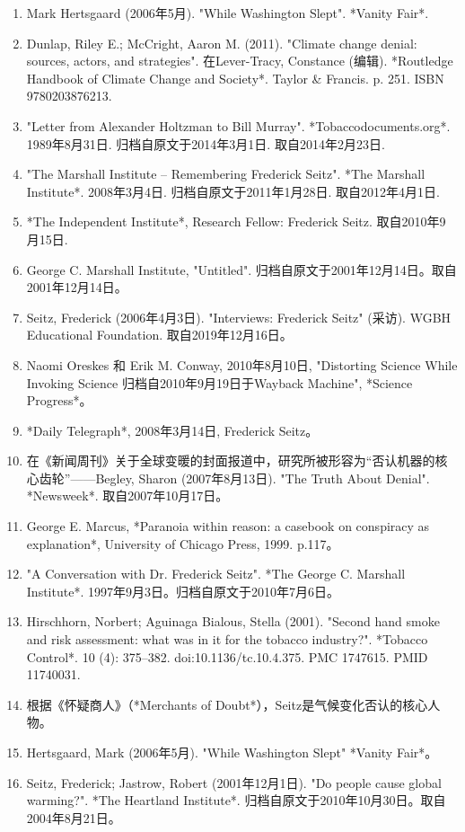 \begin{enumerate}
\item Mark Hertsgaard (2006年5月). "While Washington Slept". *Vanity Fair*.
\item Dunlap, Riley E.; McCright, Aaron M. (2011). "Climate change denial: sources, actors, and strategies". 在Lever-Tracy, Constance (编辑). *Routledge Handbook of Climate Change and Society*. Taylor & Francis. p. 251. ISBN 9780203876213.
\item "Letter from Alexander Holtzman to Bill Murray". *Tobaccodocuments.org*. 1989年8月31日. 归档自原文于2014年3月1日. 取自2014年2月23日.
\item "The Marshall Institute – Remembering Frederick Seitz". *The Marshall Institute*. 2008年3月4日. 归档自原文于2011年1月28日. 取自2012年4月1日.
\item *The Independent Institute*, Research Fellow: Frederick Seitz. 取自2010年9月15日.
\item George C. Marshall Institute, "Untitled". 归档自原文于2001年12月14日。取自2001年12月14日。
\item Seitz, Frederick (2006年4月3日). "Interviews: Frederick Seitz" (采访). WGBH Educational Foundation. 取自2019年12月16日。
\item Naomi Oreskes 和 Erik M. Conway, 2010年8月10日, "Distorting Science While Invoking Science 归档自2010年9月19日于Wayback Machine", *Science Progress*。
\item *Daily Telegraph*, 2008年3月14日, Frederick Seitz。
\item 在《新闻周刊》关于全球变暖的封面报道中，研究所被形容为“否认机器的核心齿轮”——Begley, Sharon (2007年8月13日). "The Truth About Denial". *Newsweek*. 取自2007年10月17日。
\item George E. Marcus, *Paranoia within reason: a casebook on conspiracy as explanation*, University of Chicago Press, 1999. p.117。
\item "A Conversation with Dr. Frederick Seitz". *The George C. Marshall Institute*. 1997年9月3日。归档自原文于2010年7月6日。
\item Hirschhorn, Norbert; Aguinaga Bialous, Stella (2001). "Second hand smoke and risk assessment: what was in it for the tobacco industry?". *Tobacco Control*. 10 (4): 375–382. doi:10.1136/tc.10.4.375. PMC 1747615. PMID 11740031.
\item 根据《怀疑商人》（*Merchants of Doubt*），Seitz是气候变化否认的核心人物。
\item Hertsgaard, Mark (2006年5月). "While Washington Slept" *Vanity Fair*。
\item Seitz, Frederick; Jastrow, Robert (2001年12月1日). "Do people cause global warming?". *The Heartland Institute*. 归档自原文于2010年10月30日。取自2004年8月21日。

\end{enumerate}
